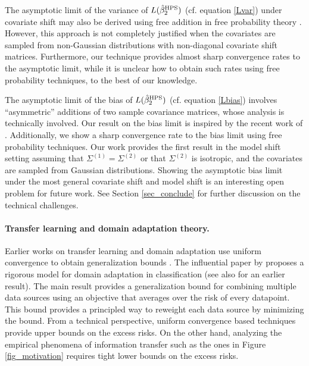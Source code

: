 The asymptotic limit of the variance of $L(\hat{\beta}_2^{\textup{HPS}})$ (cf. equation \eqref{Lvar}) under covariate shift may also be derived using free addition in free probability theory \cite{nica2006lectures}.
However, this approach is not completely justified when the covariates are sampled from non-Gaussian distributions with non-diagonal covariate shift matrices. 
Furthermore, our technique provides almost sharp convergence rates to the asymptotic limit, while it is unclear how to obtain such rates using free probability techniques, to the best of our knowledge.

The asymptotic limit of the bias of $L(\hat{\beta}_2^{\textup{HPS}})$ (cf. equation \eqref{Lbias}) involves ``asymmetric'' additions of two sample covariance matrices, whose analysis is technically involved.
Our result on the bias limit is inspired by the recent work of \citet{BES_free1,BES_free2}.
Additionally, we show a sharp convergence rate to the bias limit using free probability techniques.
Our work provides the first result in the model shift setting assuming that $\Sigma^{(1)} = \Sigma^{(2)}$ or that $\Sigma^{(2)}$ is isotropic, and the covariates are sampled from Gaussian distributions.
Showing the asymptotic bias limit under the most general covariate shift and model shift is an interesting open problem for future work.
See Section \ref{sec_conclude} for further discussion on the technical challenges.

\paragraph{Transfer learning and domain adaptation theory.}
Earlier works on transfer learning and domain adaptation use uniform convergence to obtain generalization bounds \cite{B00,BS03,M06}.
The influential paper by \citet{BBCK10} proposes a rigorous model for domain adaptation in classification (see also \citet{crammer2008learning} for an earlier result).
The main result provides a generalization bound for combining multiple data sources using an objective that averages over the risk of every datapoint.
This bound provides a principled way to reweight each data source by minimizing the bound.
From a technical perspective, uniform convergence based techniques provide upper bounds on the excess risks.
On the other hand, analyzing the empirical phenomena of information transfer such as the ones in Figure \ref{fig_motivation} requires tight lower bounds on the excess risks.

